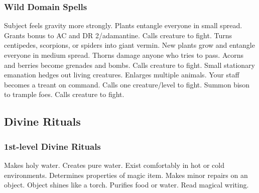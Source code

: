 \subsubsection{Wild Domain Spells}

\begin{spelllist}
   Subject feels gravity more strongly.
   Plants entangle everyone in small spread.
   Grants  bonus to AC and DR 2/adamantine.
  \spellhead[2]{}
  \spellhead[3]{}
   Calls creature to fight.
   Turns centipedes, scorpions, or spiders into giant vermin.
   New plants grow and entangle everyone in medium spread.
  \spellhead[5]{}
   Thorns damage anyone who tries to pass.
   Acorns and berries become grenades and bombs.
   Calls creature to fight.
   Small stationary emanation hedges out living creatures.
   Enlarges multiple animals.
   Your staff becomes a treant on command.
   Calls one creature/level to fight.
   Summon bison to trample foes.
   Calls creature to fight.
\end{spelllist}

\subsection{Divine Rituals}\label{Divine Rituals}
\subsubsection{1st-level Divine Rituals}
\begin{rituallist}
     Makes holy water.
     Creates pure water.
     Exist comfortably in hot or cold environments.
     Determines properties of magic item.
     Makes minor repairs on an object.
     Object shines like a torch.
     Purifies food or water.
     Read magical writing.
\end{rituallist}

